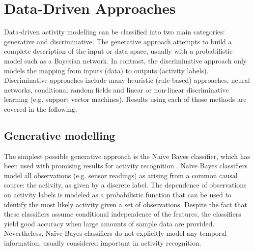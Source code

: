 \section{Data-Driven Approaches}
\label{sec:soa:datadriven}

Data-driven activity modelling can be classified into two main categories: generative and discriminative. The generative approach attempts to build a complete description of the input or data space, usually with a probabilistic model such as a Bayesian network. In contrast, the discriminative approach only models the mapping from inputs (data) to outputs (activity labels). Discriminative approaches include many heuristic (rule-based) approaches, neural networks, conditional random fields and linear or non-linear discriminative learning (e.g. support vector machines). Results using each of those methods are covered in the following.

\subsection{Generative modelling}

The simplest possible generative approach is the Na\"ive Bayes classifier, which has been used with promising results for activity recognition \cite{Bao2004} \cite{Brdiczka2007} \cite{Cook2009} \cite{Tapia2004} \cite{Kasteren2007} \cite{Maurer2006a}. Na\"ive Bayes classifiers model all observations (e.g. sensor readings) as arising from a common causal source: the activity, as given by a discrete label. The dependence of observations on activity labels is modeled as a probabilistic function that can be used to identify the most likely activity given a set of observations. Despite the fact that these classifiers assume conditional independence of the features, the classifiers yield good accuracy when large amounts of sample data are provided. Nevertheless, Na\"ive Bayes classifiers do not explicitly model any temporal information, usually considered important in activity recognition.

